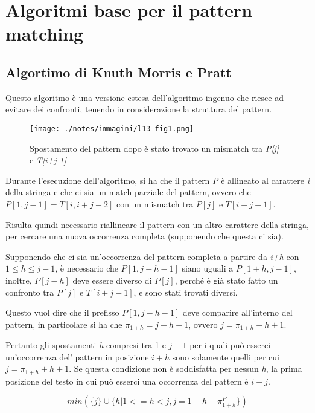 \section{Algoritmi base per il pattern matching}\label{algoritmi-base-per-il-pattern-matching}

\subsection{Algortimo di Knuth Morris e Pratt}\label{algortimo-di-knuth-morris-e-pratt}

Questo algoritmo è una versione estesa dell'algoritmo ingenuo che riesce ad evitare dei confronti, tenendo in considerazione la struttura del pattern.

\begin{figure}[htbp]
\centering
\texttt{[image: ./notes/immagini/l13-fig1.png]}
\caption{Spostamento del pattern dopo è stato trovato un mismatch tra \textit{P[j]} e \textit{T[i+j-1]}}
\end{figure}

Durante l'esecuzione dell'algoritmo, si ha che il pattern \textit{P} è allineato al carattere \textit{i} della stringa e che ci sia un match parziale del pattern, ovvero che $P[1, j-1] = T[i, i + j-2]$ con un mismatch tra $P[j]$ e $T[i+j-1]$. 

Risulta quindi necessario riallineare il pattern con un altro carattere della stringa, per cercare una nuova occorrenza completa (supponendo che questa ci sia).

Supponendo che ci sia un'occorrenza del pattern completa a partire da \emph{i+h} con $ 1 \leq h \leq j-1$, è necessario che $P[1, j-h-1]$ siano uguali a $P[1+h, j-1]$, inoltre, $P[j-h]$ deve essere diverso di
$P[j]$, perché è già stato fatto un confronto tra $P[j]$ e $T[i+j-1]$, e sono stati trovati diversi.

Questo vuol dire che il prefisso $P[1, j-h-1]$ deve comparire all'interno del pattern, in particolare si ha che $\pi_{1+h} = j - h -1$, ovvero $j = \pi_{1+h} +h +1$.

Pertanto gli spostamenti \textit{h} compresi tra 1 e $j-1$ per i quali può esserci un'occorrenza del' pattern in posizione $i+h$ sono solamente quelli per cui $j = \pi_{1+h} +h +1$.
Se questa condizione non è soddisfatta per nessun \textit{h}, la prima posizione del testo in cui può esserci una occorrenza del pattern è $i+j$.

$$
min(\{j\} \cup \{h | 1 <= h < j, j = 1 + h + \pi_{1+h}^P\})
$$

